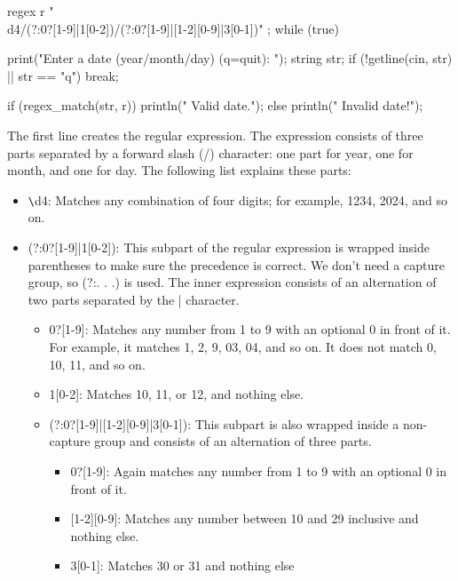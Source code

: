 \begin{cpp}
regex r { "\\d{4}/(?:0?[1-9]|1[0-2])/(?:0?[1-9]|[1-2][0-9]|3[0-1])" };
while (true) {
    print("Enter a date (year/month/day) (q=quit): ");
    string str;
    if (!getline(cin, str) || str == "q") { break; }

    if (regex_match(str, r)) { println(" Valid date."); }
    else { println(" Invalid date!"); }
}
\end{cpp}

The first line creates the regular expression. The expression consists of three parts separated by a forward slash (/) character: one part for year, one for month, and one for day. The following list explains these parts:

\begin{itemize}
\item
\verb|\|d{4}: Matches any combination of four digits; for example, 1234, 2024, and so on.

\item
(?:0?[1-9]|1[0-2]): This subpart of the regular expression is wrapped inside parentheses to make sure the precedence is correct. We don’t need a capture group, so (?:. . .) is used. The inner expression consists of an alternation of two parts separated by the | character.
\begin{itemize}
\item
0?[1-9]: Matches any number from 1 to 9 with an optional 0 in front of it. For example, it matches 1, 2, 9, 03, 04, and so on. It does not match 0, 10, 11, and so on.

\item
1[0-2]: Matches 10, 11, or 12, and nothing else.

\item
(?:0?[1-9]|[1-2][0-9]|3[0-1]): This subpart is also wrapped inside a non-capture group and consists of an alternation of three parts.
\begin{itemize}
\item
0?[1-9]: Again matches any number from 1 to 9 with an optional 0 in front of it.

\item
{}[1-2][0-9]: Matches any number between 10 and 29 inclusive and nothing else.

\item
3[0-1]: Matches 30 or 31 and nothing else
\end{itemize}

\end{itemize}

\end{itemize}


